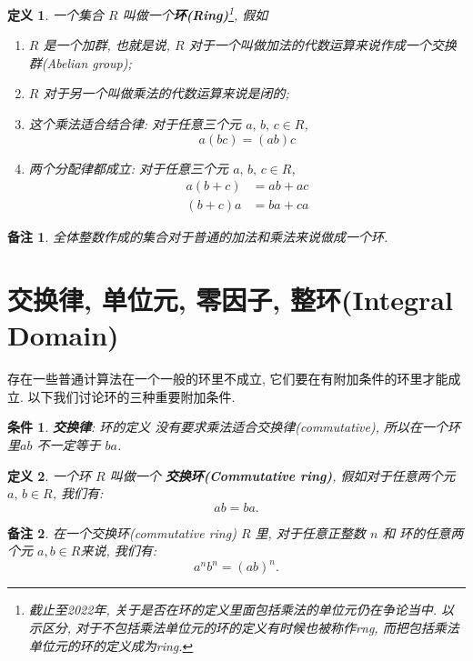 \documentclass[utf8]{ctexbook}
\newtheorem{definition}{定义}[section]
\newtheorem{memo}{备注}[section]
\newtheorem{condition}{条件}[section]
\begin{document}
\begin{definition}\label{def_ring}
一个集合 $R$ 叫做一个\textbf{环(Ring)}\footnote{截止至2022年, 关于是否在环的定义里面包括乘法的单位元仍在争论当中. 以示区分, 对于不包括乘法单位元的环的定义有时候也被称作rng, 而把包括乘法单位元的环的定义成为ring.}, 假如
\begin{enumerate}
\item{$R$ 是一个加群, 也就是说, $R$ 对于一个叫做加法的代数运算来说作成一个交换群(Abelian group);}
\item{$R$ 对于另一个叫做乘法的代数运算来说是闭的;}
\item{这个乘法适合结合律: 对于任意三个元 $a, \, b, \, c \in R$,
\begin{equation}
a(bc) = (ab) c
\end{equation}
}
\item{两个分配律都成立: 对于任意三个元 $a, \, b, \, c \in R$,
\begin{align*}
a(b+c) & = ab + ac \\
(b+c)a &= ba + ca
\end{align*}
}
\end{enumerate}
\end{definition}

\begin{memo}
全体整数作成的集合对于普通的加法和乘法来说做成一个环.
\end{memo}

\section{交换律, 单位元, 零因子, 整环(Integral Domain)}

存在一些普通计算法在一个一般的环里不成立, 它们要在有附加条件的环里才能成立. 以下我们讨论环的三种重要附加条件.

\begin{condition}
\textbf{交换律}: 环的定义 没有要求乘法适合交换律(commutative), 所以在一个环里$ab$ 不一定等于 $ba$.
\end{condition}

\begin{definition}
一个环 $R$ 叫做一个 \textbf{交换环(Commutative ring)}, 假如对于任意两个元 $a,\, b \in R$, 我们有:
\begin{equation}
a b = b a .
\end{equation}
\end{definition}

\begin{memo}
在一个交换环(commutative ring) $R$ 里, 对于任意正整数 $n$ 和 环的任意两个元 $a, b \in R$来说, 我们有:
\begin{equation}
a^n b^n = (ab)^n .
\end{equation}
\end{memo}
\end{document}

